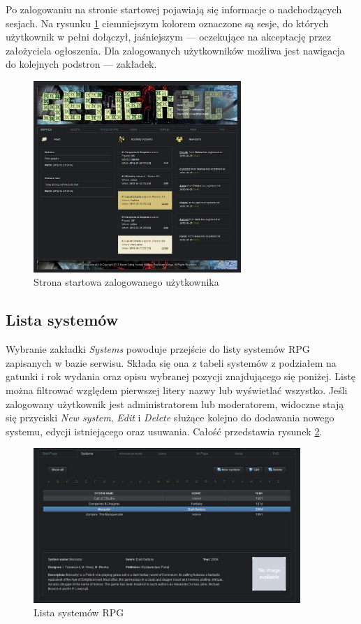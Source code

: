 Po zalogowaniu na stronie startowej pojawiają się informacje o nadchodzących sesjach. Na rysunku \ref{fig:start_page_joined} ciemniejszym kolorem oznaczone są sesje, do których użytkownik w pełni dołączył, jaśniejszym --- oczekujące na akceptację przez założyciela ogłoszenia. Dla zalogowanych użytkowników możliwa jest nawigacja do kolejnych podstron --- zakładek.
\begin{figure}[h!]	
\centering
\includegraphics[width=0.7\textwidth]{./img/interfejsy/start_page_joined}
\caption{Strona startowa zalogowanego użytkownika}
\label{fig:start_page_joined}
\end{figure}
\clearpage

\subsection{Lista systemów}
\label{sec:systems}
Wybranie zakładki \emph{Systems} powoduje przejście do listy systemów RPG zapisanych w bazie serwisu. Składa się ona z tabeli systemów z podziałem na gatunki i rok wydania oraz opisu wybranej pozycji znajdującego się poniżej. Listę można filtrować względem pierwszej litery nazwy lub wyświetlać wszystko. Jeśli zalogowany użytkownik jest administratorem lub moderatorem, widoczne stają się przyciski \emph{New system}, \emph{Edit} i \emph{Delete} służące kolejno do dodawania nowego systemu, edycji istniejącego oraz usuwania. Całość przedstawia rysunek \ref{fig:systems}.

\begin{figure}[h!]
\centering
\includegraphics[width=0.9\textwidth]{./img/interfejsy/systems}
\caption{Lista systemów RPG}
\label{fig:systems}
\end{figure}

